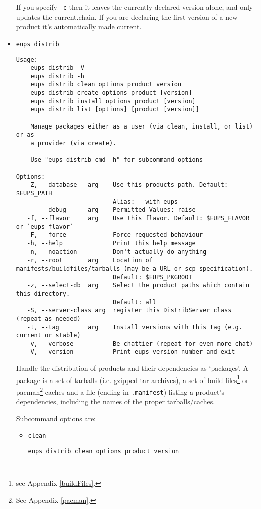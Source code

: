 \documentclass{article}
\newcommand{\code}[1]{\texttt{#1}}
\begin{document}
\begin{itemize}
If you specify \code{-c} then it leaves the currently declared version alone, and
only updates the current.chain.  If you are declaring the first version of a new
product it's automatically made current.


\item \code{eups distrib}
\begin{verbatim}
Usage:
    eups distrib -V
    eups distrib -h
    eups distrib clean options product version
    eups distrib create options product [version]
    eups distrib install options product [version]
    eups distrib list [options] [product [version]]

    Manage packages either as a user (via clean, install, or list) or as 
    a provider (via create).

    Use "eups distrib cmd -h" for subcommand options

Options:
   -Z, --database   arg    Use this products path. Default: $EUPS_PATH
                           Alias: --with-eups
       --debug      arg    Permitted Values: raise
   -f, --flavor     arg    Use this flavor. Default: $EUPS_FLAVOR or `eups flavor`
   -F, --force             Force requested behaviour
   -h, --help              Print this help message
   -n, --noaction          Don't actually do anything
   -r, --root       arg    Location of manifests/buildfiles/tarballs (may be a URL or scp specification).
                           Default: $EUPS_PKGROOT
   -z, --select-db  arg    Select the product paths which contain this directory.
                           Default: all
   -S, --server-class arg  register this DistribServer class (repeat as needed)
   -t, --tag        arg    Install versions with this tag (e.g. current or stable)
   -v, --verbose           Be chattier (repeat for even more chat)
   -V, --version           Print eups version number and exit
\end{verbatim}				%

Handle the distribution of products and their dependencies as `packages'. A
package is a set of tarballs (i.e. gzipped tar archives), a set of build files\footnote{%
  see Appendix \ref{buildFiles}.
} or pacman\footnote{%
  See Appendix \ref{pacman}.
}
caches and
a file (ending in \code{.manifest})
listing a product's dependencies, including the names of the proper tarballs/caches. 

Subcommand options are:
\begin{itemize}
\item \code{clean}
\begin{verbatim}
eups distrib clean options product version


\end{verbatim}
\end{itemize}
\end{itemize}
\end{document}
